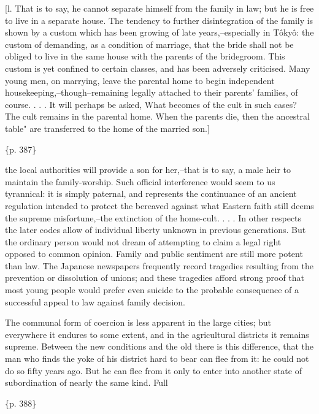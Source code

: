 [l. That is to say, he cannot separate himself from the family in law; but he is free to live in a separate house. The tendency to further disintegration of the family is shown by a custom which has been growing of late years,--especially in Tôkyô: the custom of demanding, as a condition of marriage, that the bride shall not be obliged to live in the same house with the parents of the bridegroom. This custom is yet confined to certain classes, and has been adversely criticised. Many young men, on marrying, leave the parental home to begin independent housekeeping,--though--remaining legally attached to their parents' families, of course. . . . It will perhaps be asked, What becomes of the cult in such cases? The cult remains in the parental home. When the parents die, then the ancestral table" are transferred to the home of the married son.]

\{p. 387\}

the local authorities will provide a son for her,--that is to say, a male heir to maintain the family-worship. Such official interference would seem to us tyrannical: it is simply paternal, and represents the continuance of an ancient regulation intended to protect the bereaved against what Eastern faith still deems the supreme misfortune,--the extinction of the home-cult. . . . In other respects the later codes allow of individual liberty unknown in previous generations. But the ordinary person would not dream of attempting to claim a legal right opposed to common opinion. Family and public sentiment are still more potent than law. The Japanese newspapers frequently record tragedies resulting from the prevention or dissolution of unions; and these tragedies afford strong proof that most young people would prefer even suicide to the probable consequence of a successful appeal to law against family decision.



The communal form of coercion is less apparent in the large cities; but everywhere it endures to some extent, and in the agricultural districts it remains supreme. Between the new conditions and the old there is this difference, that the man who finds the yoke of his district hard to bear can flee from it: he could not do so fifty years ago. But he can flee from it only to enter into another state of subordination of nearly the same kind. Full

\{p. 388\}

